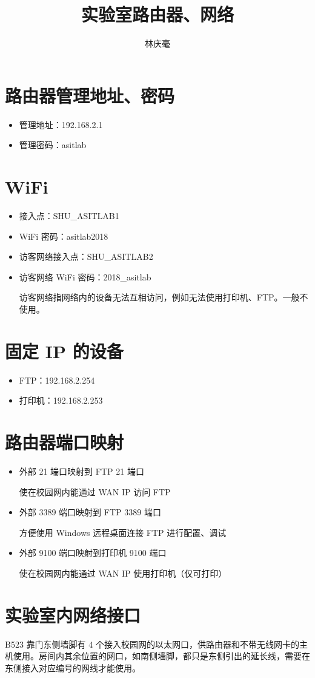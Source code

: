 \documentclass{article}
\begin{document}
\author{林庆毫}
\title{实验室路由器、网络}
\maketitle
\tableofcontents
\newpage
{}

\section{路由器管理地址、密码}
\begin{itemize}
    \item 管理地址：192.168.2.1
    \item 管理密码：asitlab
\end{itemize}

\section{WiFi}
\begin{itemize}
    \item 接入点：SHU\_ASITLAB1
    \item WiFi 密码：asitlab2018
    \item 访客网络接入点：SHU\_ASITLAB2
    \item 访客网络 WiFi 密码：2018\_asitlab
          
          访客网络指网络内的设备无法互相访问，例如无法使用打印机、FTP。一般不使用。
\end{itemize}


\section{固定 IP 的设备}
\begin{itemize}
    \item FTP：192.168.2.254
    \item 打印机：192.168.2.253
\end{itemize}

\section{路由器端口映射}
\begin{itemize}
    \item 外部 21 端口映射到 FTP 21 端口
          
          使在校园网内能通过 WAN IP 访问 FTP

    \item 外部 3389 端口映射到 FTP 3389 端口
          
          方便使用 Windows 远程桌面连接 FTP 进行配置、调试
          
    \item 外部 9100 端口映射到打印机 9100 端口
          
          使在校园网内能通过 WAN IP 使用打印机（仅可打印）
\end{itemize}

\section{实验室内网络接口}
B523 靠门东侧墙脚有 4 个接入校园网的以太网口，供路由器和不带无线网卡的主机使用。房间内其余位置的网口，如南侧墙脚，都只是东侧引出的延长线，需要在东侧接入对应编号的网线才能使用。
\end{document}
